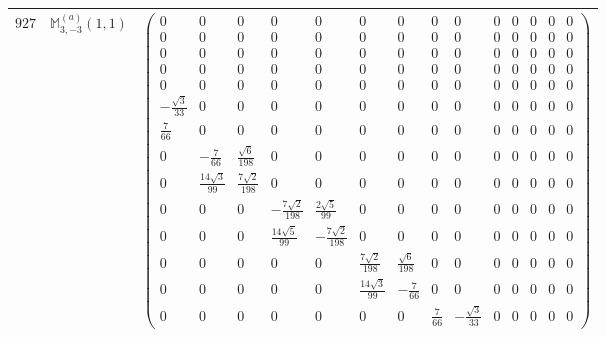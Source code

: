 \documentclass[fleqn,8pt,landscape]{jsarticle}
\begin{document}
\begin{center}
\begin{longtable}{ccc}
$ 927 $ & $ \mathbb{M}_{3,-3}^{(a)}(1,1) $ & $ \begin{pmatrix} 0 & 0 & 0 & 0 & 0 & 0 & 0 & 0 & 0 & 0 & 0 & 0 & 0 & 0 \\ 0 & 0 & 0 & 0 & 0 & 0 & 0 & 0 & 0 & 0 & 0 & 0 & 0 & 0 \\ 0 & 0 & 0 & 0 & 0 & 0 & 0 & 0 & 0 & 0 & 0 & 0 & 0 & 0 \\ 0 & 0 & 0 & 0 & 0 & 0 & 0 & 0 & 0 & 0 & 0 & 0 & 0 & 0 \\ 0 & 0 & 0 & 0 & 0 & 0 & 0 & 0 & 0 & 0 & 0 & 0 & 0 & 0 \\ - \frac{\sqrt{3}}{33} & 0 & 0 & 0 & 0 & 0 & 0 & 0 & 0 & 0 & 0 & 0 & 0 & 0 \\ \frac{7}{66} & 0 & 0 & 0 & 0 & 0 & 0 & 0 & 0 & 0 & 0 & 0 & 0 & 0 \\ 0 & - \frac{7}{66} & \frac{\sqrt{6}}{198} & 0 & 0 & 0 & 0 & 0 & 0 & 0 & 0 & 0 & 0 & 0 \\ 0 & \frac{14 \sqrt{3}}{99} & \frac{7 \sqrt{2}}{198} & 0 & 0 & 0 & 0 & 0 & 0 & 0 & 0 & 0 & 0 & 0 \\ 0 & 0 & 0 & - \frac{7 \sqrt{2}}{198} & \frac{2 \sqrt{5}}{99} & 0 & 0 & 0 & 0 & 0 & 0 & 0 & 0 & 0 \\ 0 & 0 & 0 & \frac{14 \sqrt{5}}{99} & - \frac{7 \sqrt{2}}{198} & 0 & 0 & 0 & 0 & 0 & 0 & 0 & 0 & 0 \\ 0 & 0 & 0 & 0 & 0 & \frac{7 \sqrt{2}}{198} & \frac{\sqrt{6}}{198} & 0 & 0 & 0 & 0 & 0 & 0 & 0 \\ 0 & 0 & 0 & 0 & 0 & \frac{14 \sqrt{3}}{99} & - \frac{7}{66} & 0 & 0 & 0 & 0 & 0 & 0 & 0 \\ 0 & 0 & 0 & 0 & 0 & 0 & 0 & \frac{7}{66} & - \frac{\sqrt{3}}{33} & 0 & 0 & 0 & 0 & 0 \end{pmatrix} $ \\ \hline

\end{longtable}
\end{center}
\end{document}
